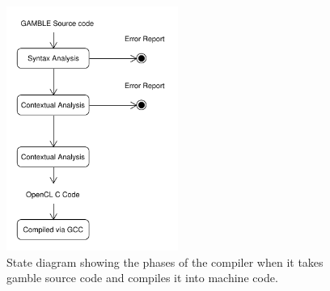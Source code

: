 \begin{figure}
\centering
\includegraphics[width=0.5\textwidth]{figures/ClassDiagrams/CompilerDiagram.pdf}
\caption{State diagram showing the phases of the compiler when it takes \gls{gamble} source code and compiles it into machine code.}\label{fig:phases}
\end{figure}


%
%
%
%
%		
\clearpage

